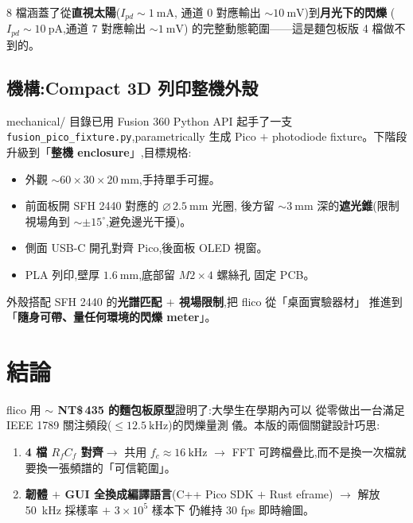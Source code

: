 \documentclass[12pt,a4paper]{article}
\begin{document}
8 檔涵蓋了從\textbf{直視太陽}(\(I_{pd} \sim \SI{1}{\milli\ampere}\),
通道 0 對應輸出 \(\sim \SI{10}{\milli\volt}\))到\textbf{月光下的閃爍}
(\(I_{pd} \sim \SI{10}{\pico\ampere}\),通道 7 對應輸出 \(\sim \SI{1}{\milli\volt}\))
的完整動態範圍——這是麵包板版 4 檔做不到的。

\subsection{機構:Compact 3D 列印整機外殼}

mechanical/ 目錄已用 Fusion 360 Python API 起手了一支
\texttt{fusion\_pico\_fixture.py},parametrically 生成 Pico \(+\)
photodiode fixture。下階段升級到「\textbf{整機 enclosure}」,目標規格:

\begin{itemize}[leftmargin=2em,itemsep=0pt]
	\item 外觀 \(\sim 60 \times 30 \times \SI{20}{\milli\meter}\),手持單手可握。
	\item 前面板開 SFH 2440 對應的 \(\varnothing\,\SI{2.5}{\milli\meter}\) 光圈,
	      後方留 \(\sim \SI{3}{\milli\meter}\) 深的\textbf{遮光錐}(限制視場角到
	      \(\sim \pm 15^\circ\),避免邊光干擾)。
	\item 側面 USB-C 開孔對齊 Pico,後面板 OLED 視窗。
	\item PLA 列印,壁厚 \(\SI{1.6}{\milli\meter}\),底部留 \(M2 \times 4\) 螺絲孔
	      固定 PCB。
\end{itemize}

外殼搭配 SFH 2440 的\textbf{光譜匹配 \(+\) 視場限制},把 flico 從「桌面實驗器材」
推進到「\textbf{隨身可帶、量任何環境的閃爍 meter}」。

\section{結論}

flico 用\textbf{ \(\sim \) NT\$\,435 的麵包板原型}證明了:大學生在學期內可以
從零做出一台滿足 IEEE 1789 關注頻段(\(\leq \SI{12.5}{\kilo\hertz}\))的閃爍量測
儀。本版的兩個關鍵設計巧思:

\begin{enumerate}[leftmargin=2em,itemsep=0pt]
	\item \textbf{4 檔 \(R_f C_f\) 對齊}\(\to\) 共用 \(f_c \approx \SI{16}{\kilo\hertz}\)
	      \(\to\) FFT 可跨檔疊比,而不是換一次檔就要換一張頻譜的「可信範圍」。
	\item \textbf{韌體 \(+\) GUI 全換成編譯語言}(C++ Pico SDK \(+\) Rust eframe)
	      \(\to\) 解放 \SI{50}{\kilo\hertz} 採樣率 \(+\) \(3 \times 10^5\) 樣本下
	      仍維持 30 fps 即時繪圖。
\end{enumerate}
\end{document}
